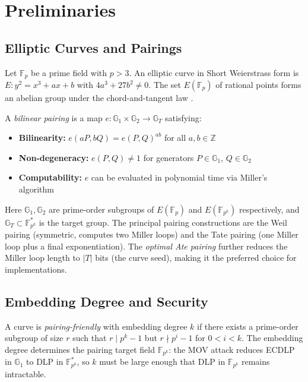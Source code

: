 \IEEEpubidadjcol
\section{Preliminaries}

\subsection{Elliptic Curves and
Pairings}\label{elliptic-curves-and-pairings}

Let \(\mathbb{F}_p\) be a prime field with \(p > 3\). An elliptic curve
in Short Weierstrass form is \(E: y^2 = x^3 + ax + b\) with
\(4a^3 + 27b^2 \neq 0\). The set \(E(\mathbb{F}_p)\) of rational points
forms an abelian group under the chord-and-tangent law
\cite{Silverman2009}.

A \emph{bilinear pairing} is a map
\(e: \mathbb{G}_1 \times \mathbb{G}_2 \to \mathbb{G}_T\) satisfying:

\begin{itemize}
\tightlist
\item
  \textbf{Bilinearity:} \(e(aP, bQ) = e(P, Q)^{ab}\) for all
  \(a, b \in \mathbb{Z}\)
\item
  \textbf{Non-degeneracy:} \(e(P, Q) \neq 1\) for generators
  \(P \in \mathbb{G}_1\), \(Q \in \mathbb{G}_2\)
\item
  \textbf{Computability:} \(e\) can be evaluated in polynomial time via
  Miller's algorithm \cite{Miller1986}
\end{itemize}

Here \(\mathbb{G}_1, \mathbb{G}_2\) are prime-order subgroups of
\(E(\mathbb{F}_p)\) and \(E(\mathbb{F}_{p^k})\) respectively, and
\(\mathbb{G}_T \subset \mathbb{F}_{p^k}^*\) is the target group. The
principal pairing constructions are the Weil pairing (symmetric,
computes two Miller loops) and the Tate pairing (one Miller loop plus a
final exponentiation). The \emph{optimal Ate pairing}
\cite{Vercauteren2010} further reduces the Miller loop length to
\(|T|\) bits (the curve seed), making it the preferred choice for
implementations.

\subsection{Embedding Degree and
Security}\label{embedding-degree-and-security}

A curve is \emph{pairing-friendly} with embedding degree \(k\) if there
exists a prime-order subgroup of size \(r\) such that \(r \mid p^k - 1\)
but \(r \nmid p^i - 1\) for \(0 < i < k\). The embedding degree
determines the pairing target field \(\mathbb{F}_{p^k}\): the MOV attack
\cite{MOV1993} reduces ECDLP in \(\mathbb{G}_1\) to DLP in
\(\mathbb{F}_{p^k}^*\), so \(k\) must be large enough that DLP in
\(\mathbb{F}_{p^k}\) remains intractable.

